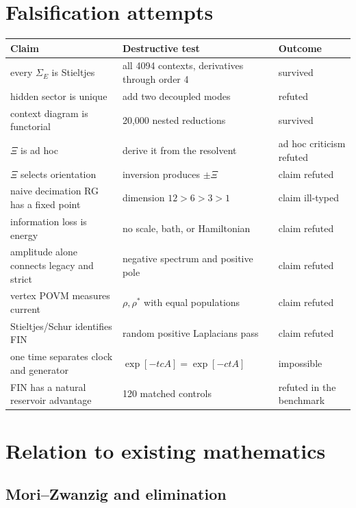 \documentclass[11pt,a4paper,openany]{report}
\begin{document}
\chapter{Falsification attempts}

\begin{center}
\begingroup\small
\setlength{\tabcolsep}{2.5pt}
\renewcommand{\arraystretch}{1.16}
\begin{longtable}{@{}p{}p{}p{}@{}}
\toprule
\textbf{Claim} & \textbf{Destructive test} & \textbf{Outcome} \\
\midrule
\endhead
every \(\Sigma_E\) is Stieltjes & all 4094 contexts, derivatives through order 4 & survived \\
hidden sector is unique & add two decoupled modes & refuted \\
context diagram is functorial & 20,000 nested reductions & survived \\
\(\Xi\) is ad hoc & derive it from the resolvent & ad hoc criticism refuted \\
\(\Xi\) selects orientation & inversion produces \(\pm\Xi\) & claim refuted \\
naive decimation RG has a fixed point & dimension \(12>6>3>1\) & claim ill-typed \\
information loss is energy & no scale, bath, or Hamiltonian & claim refuted \\
amplitude alone connects legacy and strict & negative spectrum and positive pole & claim refuted \\
vertex POVM measures current & \(\rho,\rho^\ast\) with equal populations & claim refuted \\
Stieltjes/\allowbreak{}Schur identifies FIN & random positive Laplacians pass & claim refuted \\
one time separates clock and generator & \(\exp[-tcA]=\exp[-ctA]\) & impossible \\
FIN has a natural reservoir advantage & 120 matched controls & refuted in the benchmark \\
\bottomrule
\end{longtable}
\endgroup
\end{center}

\chapter{Relation to existing mathematics}

\section{Mori--Zwanzig and elimination}
\end{document}
